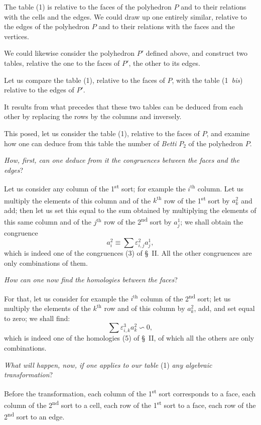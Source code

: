 \documentclass{article}
\begin{document}
The table (1) is relative to the faces of the polyhedron $P$ and to their relations with the cells and the edges. We could draw up one entirely similar, relative to the edges of the polyhedron $P$ and to their relations with the faces and the vertices.


We could likewise consider the polyhedron $P'$ defined above, and construct two tables, relative the one to the faces of $P'$, the other to its edges.

Let us compare the table (1), relative to the faces of $P$, with the table (1~\emph{bis}) relative to the edges of $P'$.

It results from what precedes that these two tables can be deduced from each other by replacing the rows by the columns and inversely.

This posed, let us consider the table (1), relative to the faces of $P$, and examine how one can deduce from this table the number of \emph{Betti} $P_{2}$ of the polyhedron $P$.

\emph{How, first, can one deduce from it the congruences between the faces and the edges}?

Let us consider any column of the 1\textsuperscript{st} sort; for example the $i^{\text{th}}$ column. Let us multiply the elements of this column and of the $k^{\text{th}}$ row of the 1\textsuperscript{st} sort by $a^{2}_{k}$ and add; then let us set this equal to the sum obtained by multiplying the elements of this same column and of the $j^{\text{th}}$ row of the 2\textsuperscript{nd} sort by $a^{1}_{j}$; we shall obtain the congruence
\[ a^{2}_{i} \equiv \sum \varepsilon^{2}_{i,j} a^{1}_{j}, \]
which is indeed one of the congruences (3) of \S~II. All the other congruences are only combinations of them.

\emph{How can one now find the homologies between the faces}?

For that, let us consider for example the $i^{\text{th}}$ column of the 2\textsuperscript{nd} sort; let us multiply the elements of the $k^{\text{th}}$ row and of this column by $a^{2}_{k}$, add, and set equal to zero; we shall find:
\[ \sum \varepsilon^{3}_{i,k} a^{2}_{k} \backsim 0, \]
which is indeed one of the homologies (5) of \S~II, of which all the others are only combinations.

\emph{What will happen, now, if one applies to our table} (1) \emph{any algebraic transformation}?

Before the transformation, each column of the 1\textsuperscript{st} sort corresponds
to a face, each column of the 2\textsuperscript{nd} sort to a cell, each row of the 1\textsuperscript{st} sort to a face, each row of the 2\textsuperscript{nd} sort to an edge.
\end{document}
